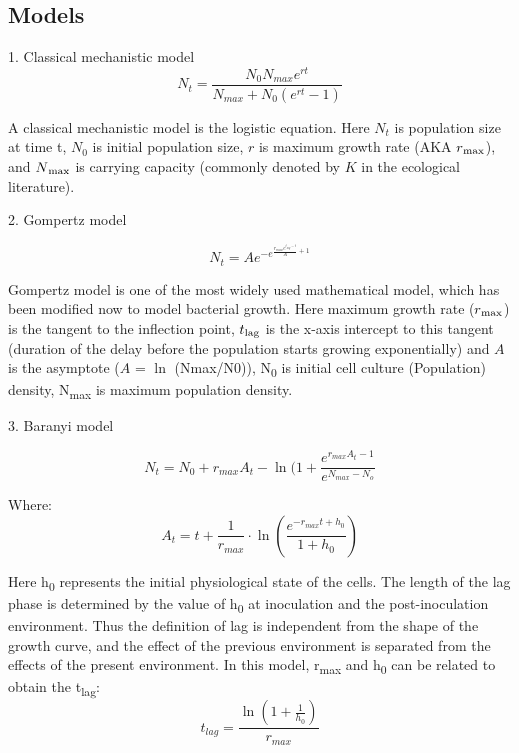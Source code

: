 \documentclass[11pt]{article}
\begin{document}
    \subsection{Models}
    1. Classical mechanistic model
    \begin{equation}
		N_{t} = \frac{N_0N_{max}e^{rt}}{N_{max} + N_0(e^{rt} - 1) }
		\end{equation}
		
    A classical mechanistic model is the logistic equation. Here $N_t$ is population size at time t, $N_0$ is initial population size, $r$ is maximum growth rate (AKA $r\textsubscript{max}$), and $N\textsubscript{max}$ is carrying capacity (commonly denoted by $K$ in the ecological literature).

    2. Gompertz model \citep{zwietering1990modeling}
    
    \begin{equation}
		N_{t} = Ae^{-e^{\frac{r_{max}e^{t_{lag}-t}}{A} + 1}}
		\end{equation}
		
	Gompertz model is one of the most widely used mathematical model, which has been modified now to model bacterial growth\citep{gibson1988predicting}. Here maximum growth rate ($r\textsubscript{max}$) is the tangent to the inflection point, $t\textsubscript{lag}$ is the x-axis intercept to this tangent (duration of the delay before the population starts growing exponentially) and $A$ is the asymptote ($A$ = $\ln$ (N\textrm{max}/N\textrm{0})), N\textsubscript{0} is initial cell culture (Population) density, N\textsubscript{max} is maximum population density.
	
	3. Baranyi model\citep{baranyi1993non}
	
	 \begin{equation}
		N_{t} = N_0 + r_{max}A_{t} - \ln (1 + \frac{e^{r_{max}A_{t}-1}}{e^{N_{max}-N_o}}
		\end{equation}
		
	Where:
	\begin{equation}
		A_{t} = t + \frac{1}{r_{max}}\cdot\ln (\frac{e^{-r_{max}t+h_0}}{1+h_0})
		\end{equation}
	
	Here h\textsubscript{0} represents the initial physiological state of the cells. The length of the lag phase is determined by the value of h\textsubscript{0} at inoculation and the post-inoculation environment. Thus the definition of lag is independent from the shape of the growth curve, and the effect of the previous environment is separated from the effects of the present environment. In this model, r\textsubscript{max} and h\textsubscript{0} can be related to obtain the t\textsubscript{lag}:	
	\begin{equation}
	    t_{lag} = \frac{\ln (1+\frac{1}{h_0})}{r_{max}}
	\end{equation}
	
\end{document}
